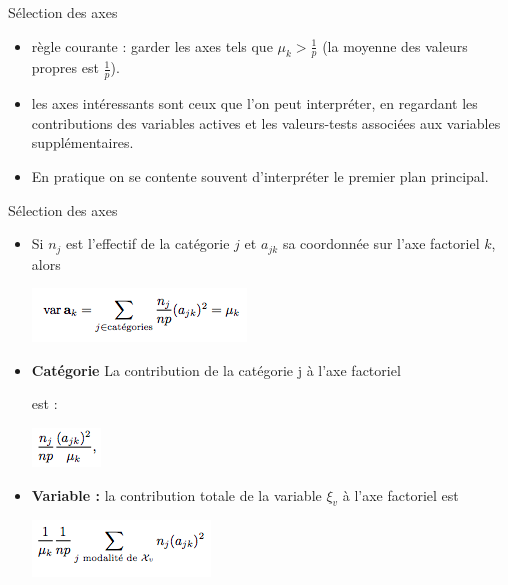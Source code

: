 \documentclass[11pt]{beamer}
\begin{document}

\begin{frame}{ Sélection des axes }
 
 \begin{itemize}
 \item  règle courante : garder les axes tels que $\mu_k > \frac{1}{p}$ (la moyenne des valeurs propres est $\frac{1}{p}$).
 \item  les axes intéressants sont ceux que l'on peut interpréter,
en regardant les contributions des variables actives et les valeurs-tests associées aux variables supplémentaires.
 \item En pratique on se contente souvent d’interpréter le
premier plan principal.
 \end{itemize}
 
 
\end{frame}




\begin{frame}{ Sélection des axes }
 
 \begin{itemize}
 \item   Si $n_j$ est l’effectif de la catégorie $j$ et $a_{jk}$ sa coordonnée sur l’axe factoriel $k$, alors

\centering  
  
 \includegraphics[scale=0.7]{AFC9} 
 
 
 \item  \textbf{Catégorie} La contribution de la catégorie j à l’axe factoriel

est : 

\centering 

 \includegraphics[scale=0.7]{AFC10} 
 
 \item  \textbf{Variable :} la contribution totale de la variable $\xi_v$ à l'axe factoriel est 
 
  \includegraphics[scale=0.7]{AFC11} 
  
   
 \end{itemize}
 
 
\end{frame}
\end{document}

